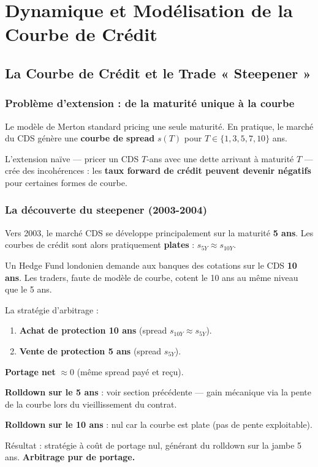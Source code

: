 \section{Dynamique et Modélisation de la Courbe de Crédit}

\subsection{La Courbe de Crédit et le Trade « Steepener »}

\subsubsection{Problème d'extension : de la maturité unique à la courbe}

Le modèle de Merton standard pricing une seule maturité. En pratique, le marché du CDS génère une \textbf{courbe de spread} $s(T)$ pour $T \in \{1, 3, 5, 7, 10\}$ ans.

L'extension naïve — pricer un CDS $T$-ans avec une dette arrivant à maturité $T$ — crée des incohérences : les \textbf{taux forward de crédit peuvent devenir négatifs} pour certaines formes de courbe.

\subsubsection{La découverte du steepener (2003-2004)}

\begin{exemple}
Vers 2003, le marché CDS se développe principalement sur la maturité \textbf{5 ans}. Les courbes de crédit sont alors pratiquement \textbf{plates} : $s_{5Y} \approx s_{10Y}$.

Un Hedge Fund londonien demande aux banques des cotations sur le CDS \textbf{10 ans}. Les traders, faute de modèle de courbe, cotent le 10 ans au même niveau que le 5 ans.

\medskip
La stratégie d'arbitrage :
\begin{enumerate}
    \item \textbf{Achat de protection 10 ans} (spread $s_{10Y} \approx s_{5Y}$).
    \item \textbf{Vente de protection 5 ans} (spread $s_{5Y}$).
\end{enumerate}

\textbf{Portage net} $\approx 0$ (même spread payé et reçu).

\textbf{Rolldown sur le 5 ans} : voir section précédente — gain mécanique via la pente de la courbe lors du vieillissement du contrat.

\textbf{Rolldown sur le 10 ans} : nul car la courbe est plate (pas de pente exploitable).

\medskip
Résultat : stratégie à coût de portage nul, générant du rolldown sur la jambe 5 ans. \textbf{Arbitrage pur de portage.}
\end{exemple}

